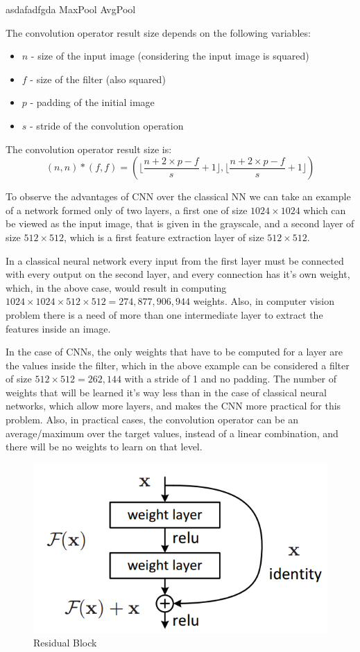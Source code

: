 asdafadfgda MaxPool AvgPool

The convolution operator result size depends on the following variables:
\begin{itemize}
	\item $n$ - size of the input image (considering the input image is squared)
	\item $f$ - size of the filter (also squared)
	\item $p$ - padding of the initial image
	\item $s$ - stride of the convolution operation
\end{itemize}
The convolution operator result size is:
$$ (n, n) * (f, f) = ( \lfloor \frac{n + 2 \times p - f}{s} + 1 \rfloor , \lfloor \frac{n + 2 \times p - f}{s} + 1 \rfloor )$$

To observe the advantages of CNN over the classical NN we can take an example of a network formed only of two layers, a first one of size $1024\times1024$ which can be viewed as the input image, that is given in the grayscale, and a second layer of size $512\times512$, which is a first feature extraction layer of size $512\times512$.

In a classical neural network every input from the first layer must be connected with every output on the second layer, and every connection has it's own weight, which, in the above case, would result in computing $1024 \times 1024 \times 512 \times 512 = 274,877,906,944$ weights. Also, in computer vision problem there is a need of more than one intermediate layer to extract the features inside an image.

In the case of CNNs, the only weights that have to be computed for a layer are the values inside the filter, which in the above example can be considered a filter of size $512 \times 512 = 262,144‬$ with a stride of 1 and no padding. The number of weights that will be learned it's way less than in the case of classical neural networks, which allow more layers, and makes the CNN more practical for this problem. Also, in practical cases, the convolution operator can be an average/maximum over the target values, instead of a linear combination, and there will be no weights to learn on that level.

 \begin{figure}[H]
	\includegraphics[width=\textwidth]{Pictures/007SkipConnection.png}
	\caption{Residual Block \cite{ResNetPaper}}
	\label{SkipConnection}
\end{figure}

